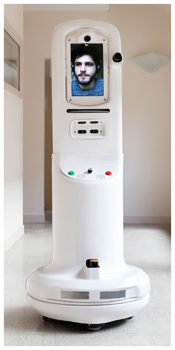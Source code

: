 \documentclass[letterpaper, 10 pt, conference]{ieeeconf}
\begin{document}
  	\begin{figure}[tbh]
	\centering
      \begin{subfigure}[b]{0.35\columnwidth}
          \includegraphics[scale = 0.14]{images/robot2.jpg}


\end{subfigure}
\end{figure}
\end{document}
